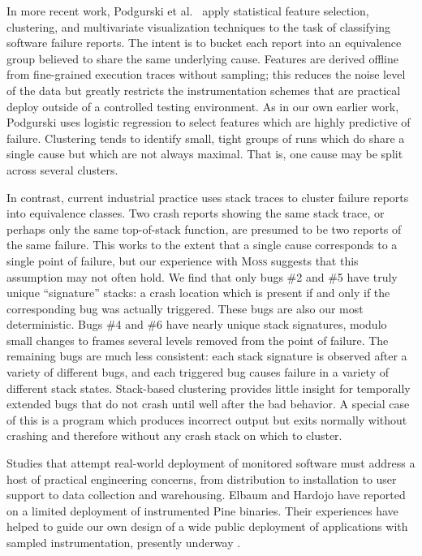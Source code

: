 \documentclass{sig-alternate}
\newcommand{\moss}{\textsc{Moss}\xspace}
\newcommand{\comment}[1]{}
\begin{document}
In more recent work, Podgurski et al.\ \cite{ICSE`03*465} apply
statistical feature selection, clustering, and multivariate
visualization techniques to the task of classifying software failure
reports.  The intent is to bucket each report into an equivalence
group believed to share the same underlying cause.  Features are
derived offline from fine-grained execution traces without sampling;
this reduces the noise level of the data but greatly restricts the
instrumentation schemes that are practical deploy outside of a
controlled testing environment.  As in our own earlier work, Podgurski
uses logistic regression to select features which are highly
predictive of failure.  \comment{Is it worth noting that we use
different strategies for limiting the size of the set of selected
features?  We use regularized logistic regression whereas Podgurski
applies standard logistic regression to randomly selected subsets of
the complete feature set and keeps the best-performing subset.}
Clustering tends to identify small, tight groups of runs which do
share a single cause but which are not always maximal.  That is, one
cause may be split across several clusters.

In contrast, current
industrial practice uses stack traces to cluster failure reports into
equivalence classes.  Two crash reports showing the same stack trace,
or perhaps only the same top-of-stack function, are presumed to be two
reports of the same failure.  This works to the extent that a single
cause corresponds to a single point of failure, but our experience
with \moss suggests that this assumption may not often hold.  We find
that only bugs \#2 and \#5 have truly unique ``signature'' stacks: a
crash location which is present if and only if the corresponding bug
was actually triggered.  These bugs are also our most deterministic.
Bugs \#4 and \#6 have nearly unique stack signatures, modulo small
changes to frames several levels removed from the point of failure.
The remaining bugs are much less consistent: each stack signature is
observed after a variety of different bugs, and each triggered bug
causes failure in a variety of different stack states.  Stack-based
clustering provides little insight for temporally extended bugs that
do not crash until well after the bad behavior.  A special case of
this is a program which produces incorrect output but exits normally
without crashing and therefore without any crash stack on which to
cluster.

Studies that attempt real-world deployment of monitored software must
address a host of practical engineering concerns, from distribution to
installation to user support to data collection and warehousing.
Elbaum and Hardojo \cite{Elbaum:2003:DISATA} have reported on a
limited deployment of instrumented Pine binaries.  Their experiences
have helped to guide our own design of a wide public deployment of
applications with sampled instrumentation, presently underway
\cite{Liblit:2003:CBIP}.
\end{document}
